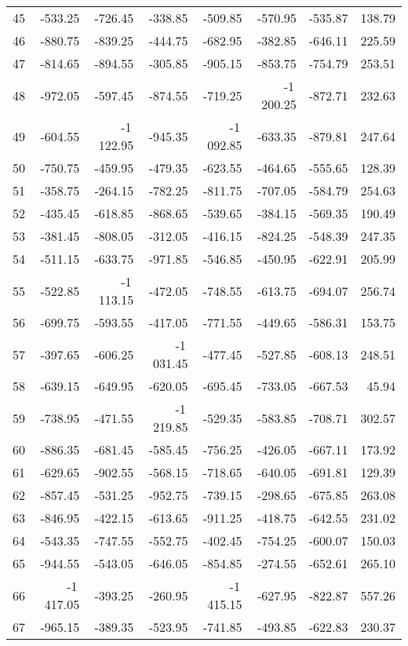 \begin{longtable}{rrrrrrrr}
45 & -533.25 & -726.45 & -338.85 & -509.85 & -570.95 & -535.87 & 138.79  \\
46 & -880.75 & -839.25 & -444.75 & -682.95 & -382.85 & -646.11 & 225.59  \\
47 & -814.65 & -894.55 & -305.85 & -905.15 & -853.75 & -754.79 & 253.51  \\
48 & -972.05 & -597.45 & -874.55 & -719.25 & -1\,200.25 & -872.71 & 232.63  \\
49 & -604.55 & -1\,122.95 & -945.35 & -1\,092.85 & -633.35 & -879.81 & 247.64  \\
50 & -750.75 & -459.95 & -479.35 & -623.55 & -464.65 & -555.65 & 128.39  \\
51 & -358.75 & -264.15 & -782.25 & -811.75 & -707.05 & -584.79 & 254.63  \\
52 & -435.45 & -618.85 & -868.65 & -539.65 & -384.15 & -569.35 & 190.49  \\
53 & -381.45 & -808.05 & -312.05 & -416.15 & -824.25 & -548.39 & 247.35  \\
54 & -511.15 & -633.75 & -971.85 & -546.85 & -450.95 & -622.91 & 205.99  \\
55 & -522.85 & -1\,113.15 & -472.05 & -748.55 & -613.75 & -694.07 & 256.74  \\
56 & -699.75 & -593.55 & -417.05 & -771.55 & -449.65 & -586.31 & 153.75  \\
57 & -397.65 & -606.25 & -1\,031.45 & -477.45 & -527.85 & -608.13 & 248.51  \\
58 & -639.15 & -649.95 & -620.05 & -695.45 & -733.05 & -667.53 & 45.94  \\
59 & -738.95 & -471.55 & -1\,219.85 & -529.35 & -583.85 & -708.71 & 302.57  \\
60 & -886.35 & -681.45 & -585.45 & -756.25 & -426.05 & -667.11 & 173.92  \\
61 & -629.65 & -902.55 & -568.15 & -718.65 & -640.05 & -691.81 & 129.39  \\
62 & -857.45 & -531.25 & -952.75 & -739.15 & -298.65 & -675.85 & 263.08  \\
63 & -846.95 & -422.15 & -613.65 & -911.25 & -418.75 & -642.55 & 231.02  \\
64 & -543.35 & -747.55 & -552.75 & -402.45 & -754.25 & -600.07 & 150.03  \\
65 & -944.55 & -543.05 & -646.05 & -854.85 & -274.55 & -652.61 & 265.10  \\
66 & -1\,417.05 & -393.25 & -260.95 & -1\,415.15 & -627.95 & -822.87 & 557.26  \\
67 & -965.15 & -389.35 & -523.95 & -741.85 & -493.85 & -622.83 & 230.37  \\

\end{longtable}
